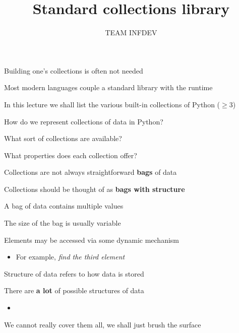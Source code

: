 \documentclass{beamer}
\title{Standard collections library}
\author{TEAM INFDEV}
\institute{Hogeschool Rotterdam \\ 
Rotterdam, Netherlands}
\date{}
\begin{document}
\maketitle

\begin{slide}{
\item Building one's collections is often not needed
\item Most modern languages couple a standard library with the runtime
\item In this lecture we shall list the various built-in collections of Python ($\geq 3$)
}\end{slide}

\begin{slide}{
\item How do we represent collections of data in Python?
\item What sort of collections are available?
\item What properties does each collection offer?
}\end{slide}

\begin{slide}{
\item Collections are not always straightforward \textbf{bags} of data
\item Collections should be thought of as \textbf{bags with structure}
}\end{slide}

\begin{slide}{
\item A bag of data contains multiple values
\item The size of the bag is usually variable
\item Elements may be accessed via some dynamic mechanism
\begin{itemize}
\item For example, \textit{find the third element}
\end{itemize}
}\end{slide}

\begin{slide}{
\item Structure of data refers to how data is stored
\item There are \textbf{a lot} of possible structures of data
\begin{itemize}
\item 
\end{itemize}
\item We cannot really cover them all, we shall just brush the surface
}\end{slide}
\end{document}
